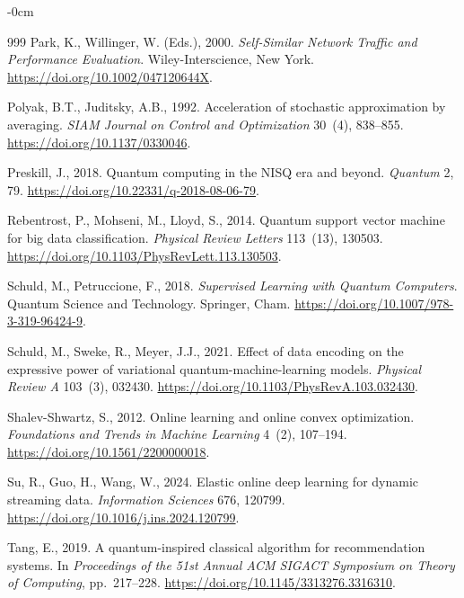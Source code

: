 \documentclass[sensors,article,submit,pdftex,moreauthors]{Definitions/mdpi}
\begin{document}
\begin{adjustwidth}{-\extralength}{0cm}
\begin{thebibliography}{999}
Park, K., Willinger, W. (Eds.), 2000.
\newblock \emph{Self-Similar Network Traffic and Performance Evaluation}.
\newblock Wiley-Interscience, New York.
\newblock \url{https://doi.org/10.1002/047120644X}.

Polyak, B.T., Juditsky, A.B., 1992.
\newblock Acceleration of stochastic approximation by averaging.
\newblock \emph{SIAM Journal on Control and Optimization} 30~(4), 838--855.
\newblock \url{https://doi.org/10.1137/0330046}.

Preskill, J., 2018.
\newblock Quantum computing in the NISQ era and beyond.
\newblock \emph{Quantum} 2, 79.
\newblock \url{https://doi.org/10.22331/q-2018-08-06-79}.

Rebentrost, P., Mohseni, M., Lloyd, S., 2014.
\newblock Quantum support vector machine for big data classification.
\newblock \emph{Physical Review Letters} 113~(13), 130503.
\newblock \url{https://doi.org/10.1103/PhysRevLett.113.130503}.

Schuld, M., Petruccione, F., 2018.
\newblock \emph{Supervised Learning with Quantum Computers}.
\newblock Quantum Science and Technology. Springer, Cham.
\newblock \url{https://doi.org/10.1007/978-3-319-96424-9}.

Schuld, M., Sweke, R., Meyer, J.J., 2021.
\newblock Effect of data encoding on the expressive power of variational quantum-machine-learning models.
\newblock \emph{Physical Review A} 103~(3), 032430.
\newblock \url{https://doi.org/10.1103/PhysRevA.103.032430}.

Shalev-Shwartz, S., 2012.
\newblock Online learning and online convex optimization.
\newblock \emph{Foundations and Trends in Machine Learning} 4~(2), 107--194.
\newblock \url{https://doi.org/10.1561/2200000018}.

Su, R., Guo, H., Wang, W., 2024.
\newblock Elastic online deep learning for dynamic streaming data.
\newblock \emph{Information Sciences} 676, 120799.
\newblock \url{https://doi.org/10.1016/j.ins.2024.120799}.

Tang, E., 2019.
\newblock A quantum-inspired classical algorithm for recommendation systems.
\newblock In \emph{Proceedings of the 51st Annual ACM SIGACT Symposium on Theory of Computing}, pp.~217--228.
\newblock \url{https://doi.org/10.1145/3313276.3316310}.


\end{thebibliography}
\end{adjustwidth}
\end{document}
